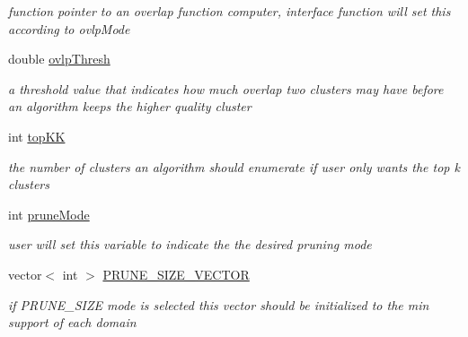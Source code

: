 \begin{DoxyCompactItemize}
\begin{DoxyCompactList}\small\item\em function pointer to an overlap function computer, interface function will set this according to ovlpMode \item\end{DoxyCompactList}\item 
\hypertarget{class_lattice_algos_ae50e2eab1478e1bced92b0f1f1bcdc09}{
double \hyperlink{class_lattice_algos_ae50e2eab1478e1bced92b0f1f1bcdc09}{ovlpThresh}}
\label{class_lattice_algos_ae50e2eab1478e1bced92b0f1f1bcdc09}

\begin{DoxyCompactList}\small\item\em a threshold value that indicates how much overlap two clusters may have before an algorithm keeps the higher quality cluster \item\end{DoxyCompactList}\item 
\hypertarget{class_lattice_algos_a90e06533d513efc4635905624283eeae}{
int \hyperlink{class_lattice_algos_a90e06533d513efc4635905624283eeae}{topKK}}
\label{class_lattice_algos_a90e06533d513efc4635905624283eeae}

\begin{DoxyCompactList}\small\item\em the number of clusters an algorithm should enumerate if user only wants the top k clusters \item\end{DoxyCompactList}\item 
\hypertarget{class_lattice_algos_a5a4badfea96f02f89d8943ca7fecc2ab}{
int \hyperlink{class_lattice_algos_a5a4badfea96f02f89d8943ca7fecc2ab}{pruneMode}}
\label{class_lattice_algos_a5a4badfea96f02f89d8943ca7fecc2ab}

\begin{DoxyCompactList}\small\item\em user will set this variable to indicate the the desired pruning mode \item\end{DoxyCompactList}\item 
vector$<$ int $>$ \hyperlink{class_lattice_algos_a244d9a63307846c2df232091a78a6759}{PRUNE\_\-SIZE\_\-VECTOR}
\begin{DoxyCompactList}\small\item\em if PRUNE\_\-SIZE mode is selected this vector should be initialized to the min support of each domain \item\end{DoxyCompactList}\end{DoxyCompactItemize}
